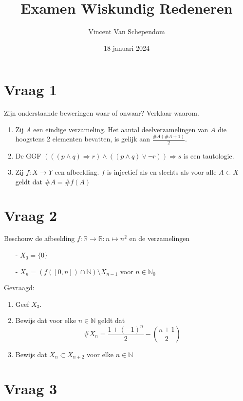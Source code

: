 \documentclass[kulak]{kulakarticle} %
\title{Examen Wiskundig Redeneren}
\author{Vincent Van Schependom}
\date{18 januari 2024}
\begin{document}
	\maketitle

	\section*{Vraag 1}

	Zijn onderstaande beweringen waar of onwaar? Verklaar waarom.

	\begin{enumerate}
		\item Zij \(A\) een eindige verzameling. Het aantal deelverzamelingen van \(A\) die hoogstens 2 elementen bevatten, is gelijk aan \(\frac{\# A(\# A+1)}{2}\).
		\item De GGF \( (((p\land q) \Rightarrow r) \land ((p\land q) \lor \neg r)) \Rightarrow s \) is een tautologie.
		\item Zij \(f:X\rightarrow Y\) een afbeelding. \(f\) is injectief als en slechts als voor alle \(A\subset X\) geldt dat \(\# A= \# f(A)\)
	\end{enumerate}

	\section*{Vraag 2}

	Beschouw de afbeelding \(f:\mathbb{R}\rightarrow\mathbb{R}:n\mapsto n^2\) en de verzamelingen
	\begin{itemize}
		\item[-] \(X_0=\{0\}\)
		\item[-] \(X_n=(f([0,n])\cap \mathbb{N}) \setminus X_{n-1}\) \hspace{1cm} voor \(n\in \mathbb{N}_0\)
	\end{itemize}

	\noindent Gevraagd:

	\begin{enumerate}
		\item Geef \(X_3\).
		\item Bewijs dat voor elke \(n \in \mathbb{N}\) geldt dat \[\#X_n=\frac{1+(-1)^n}{2}-{ n+1 \choose 2}\]
		\item Bewijs dat \(X_{n}\subset X_{n+2}\) voor elke \(n \in \mathbb{N}\)
	\end{enumerate}

	\section*{Vraag 3}
\end{document}
